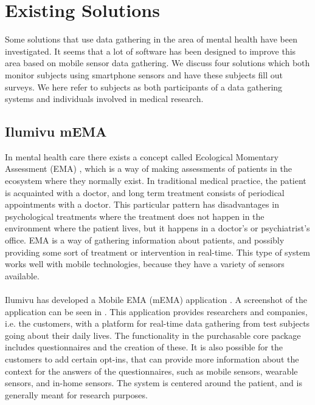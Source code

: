 
\section{Existing Solutions}
\label{sec:existing_solutions}

Some solutions that use data gathering in the area of mental health have been investigated. It seems that a lot of software has been designed to improve this area based on mobile sensor data gathering. We discuss four solutions which both monitor subjects using smartphone sensors and have these subjects fill out surveys. We here refer to subjects as both participants of a data gathering systems and individuals involved in medical research.

\subsection{Ilumivu mEMA}
\label{sub:ilumivu_mema}
In mental health care there exists a concept called Ecological Momentary Assessment (EMA) \parencite{shiffman2008ecological}, which is a way of making assessments of patients in the ecosystem where they normally exist. In traditional medical practice, the patient is acquainted with a doctor, and long term treatment consists of periodical appointments with a doctor. This particular pattern has disadvantages in psychological treatments where the treatment does not happen in the environment where the patient lives, but it happens in a doctor's or psychiatrist's office. EMA is a way of gathering information about patients, and possibly providing some sort of treatment or intervention in real-time. This type of system works well with mobile technologies, because they have a variety of sensors available.
\\\\
Ilumivu has developed a Mobile EMA (mEMA) application \parencite{lumivu}. A screenshot of the application can be seen in . This application provides researchers and companies, i.e. the customers, with a platform for real-time data gathering from test subjects going about their daily lives. The functionality in the purchasable core package includes questionnaires and the creation of these. It is also possible for the customers to add certain opt-ins, that can provide more information about the context for the answers of the questionnaires, such as mobile sensors, wearable sensors, and in-home sensors. The system is centered around the patient, and is generally meant for research purposes.

